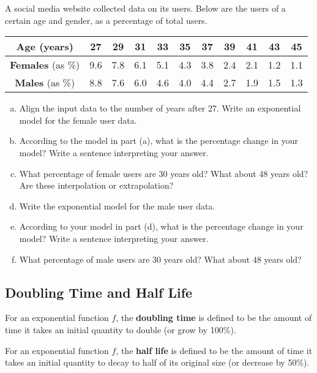 \documentclass[notes]{subfiles}
\begin{document}
		\begin{ex}
			A social media website collected data on its users.  Below are the users of a certain age and gender, as a percentage of total users.
				\begin{center}
					{\renewcommand{\arraystretch}{1.2}
					\begin{tabular}{|c||c|c|c|c|c|c|c|c|c|c|}\hline
						\textbf{Age} (years) & 27 & 29 & 31 & 33 & 35 & 37 & 39 & 41 & 43 & 45  \\ \hline
						\textbf{Females} (as \%) & 9.6 & 7.8 & 6.1 & 5.1 & 4.3 & 3.8 & 2.4 & 2.1 & 1.2 & 1.1\\ \hline
						\textbf{Males} (as \%) & 8.8 & 7.6 & 6.0 & 4.6 & 4.0 & 4.4 & 2.7 & 1.9 & 1.5 & 1.3\\ \hline
					\end{tabular}
					}
				\end{center}
				\begin{enumerate}[(a)]
					\item Align the input data to the number of years after 27.  Write an exponential model for the female user data.
					\item According to the model in part (a), what is the percentage change in your model?  Write a sentence interpreting your answer.
						\newpage

					\item What percentage of female users are 30 years old?  What about 48 years old?  Are these interpolation or extrapolation?

					\item Write the exponential model for the male user data.

					\item According to your model in part (d), what is the percentage change in your model?  Write a sentence interpreting your answer.

					\item What percentage of male users are 30 years old?  What about 48 years old?
				\end{enumerate}
		\end{ex}
			\newpage
	\subsection*{Doubling Time and Half Life}
		\begin{defn}
			For an exponential function $f$, the \textbf{doubling time} is defined to be the amount of time it takes an initial quantity to double (or grow by 100\%).
		\end{defn}
		\begin{defn}
			For an exponential function $f$, the \textbf{half life} is defined to be the amount of time it takes an initial quantity to decay to half of its original size (or decrease by 50\%).
		\end{defn}
		
\end{document}

